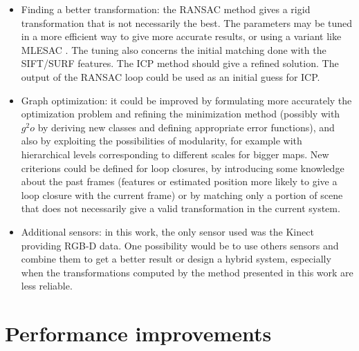 \begin{itemize}
\item Finding a better transformation: the \gls{RANSAC} method gives a rigid transformation that is not necessarily the best. The parameters may be tuned in a more efficient way to give more accurate results, or using a variant like MLESAC \cite{TorrZ00}. The tuning also concerns the initial matching done with the \gls{SIFT}/\gls{SURF} features. The \gls{ICP} \cite{zhang_92_icp} method should give a refined solution. The output of the \gls{RANSAC} loop could be used as an initial guess for \gls{ICP}. 
\item Graph optimization: it could be improved by formulating more accurately the optimization problem and refining the minimization method (possibly with~$g^2o$ by deriving new classes and defining appropriate error functions), and also by exploiting the possibilities of modularity, for example with hierarchical levels corresponding to different scales for bigger maps. New criterions could be defined for loop closures, by introducing some knowledge about the past frames (features or estimated position more likely to give a loop closure with the current frame) or by matching only a portion of scene that does not necessarily give a valid transformation in the current system.
\item Additional sensors: in this work, the only sensor used was the Kinect providing RGB-D data. One possibility would be to use others sensors and combine them to get a better result or design a hybrid system, especially when the transformations computed by the method presented in this work are less reliable.
\end{itemize}

\section{Performance improvements}

